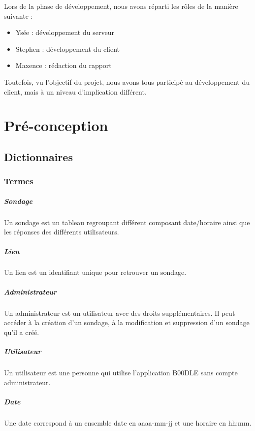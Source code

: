 \documentclass[titlepage]{report}
\begin{document}
\par Lors de la phase de développement, nous avons réparti les rôles de la manière suivante : \begin{itemize}
	\item Ysée : développement du serveur
	\item Stephen : développement du client
	\item Maxence : rédaction du rapport
\end{itemize}
\par Toutefois, vu l'objectif du projet, nous avons tous participé au développement du client, mais à un niveau d'implication différent.


\chapter{Pré-conception}

\section{Dictionnaires}
\subsection{Termes}
\paragraph{Sondage} Un sondage est un tableau regroupant différent composant date/horaire ainsi que les réponses des différents utilisateurs.
\paragraph{Lien} Un lien est un identifiant unique pour retrouver un sondage.
\paragraph{Administrateur} Un administrateur est un utilisateur avec des droits supplémentaires. Il peut accéder à la création d’un sondage, à la modification et suppression d’un sondage qu’il a créé.
\paragraph{Utilisateur} Un utilisateur est une personne qui utilise l’application B00DLE sans compte administrateur.
\paragraph{Date} Une date correspond à un ensemble date en aaaa-mm-jj et une horaire en hh:mm.
\end{document}
